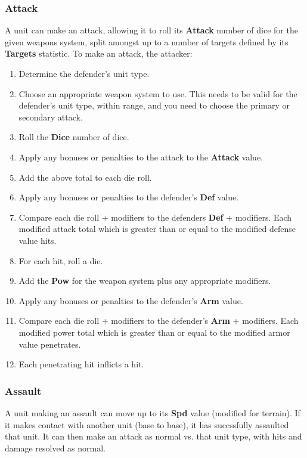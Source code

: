 \documentclass[12pt,titlepage]{article}
\begin{document}
\begin{multicols}{2}
 
\subsubsection{Attack}

A unit can make an attack, allowing it to roll its {\bf Attack} number
of dice for the given weapons system, split amongst up to a number of
targets defined by its {\bf Targets} statistic. To make an attack, the
attacker:
\begin{enumerate}
\item Determine the defender's unit type.
\item Choose an appropriate weapon system to use. This needs to be
  valid for the defender's unit type, within range, and you need to
  choose the primary or secondary attack.
\item Roll the {\bf Dice} number of dice.
\item Apply any bonuses or penalties to the attack to the {\bf Attack}
  value. 
\item Add the above total to each die roll.
\item Apply any bonuses or penalties to the defender's {\bf Def}
  value.
\item Compare each die roll + modifiers to the defenders
  {\bf Def} + modifiers. Each modified attack total which is greater
  than or equal to the modified defense value hits.
\item For each hit, roll a die.
\item Add the {\bf Pow} for the weapon system plus any appropriate
  modifiers.
\item Apply any bonuses or penalties to the defender's {\bf Arm}
  value.
\item Compare each die roll + modifiers to the defender's {\bf Arm} +
  modifiers. Each modified power total which is greater than or equal
  to the modified armor value penetrates.
\item Each penetrating hit inflicts a hit.

\end{enumerate}

\subsubsection{Assault}
 A unit making an assault can move up to its {\bf Spd} value (modified
 for terrain). If it makes contact with another unit (base to base),
 it has succssfully assaulted that unit. It can then make an attack as
 normal vs. that unit type, with hits and damage resolved as normal.


\end{multicols}
\end{document}
